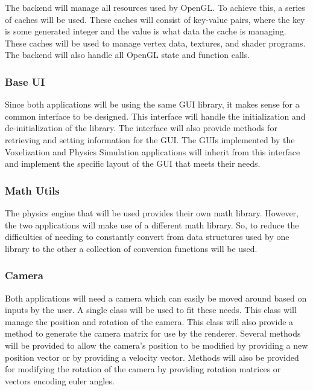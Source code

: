 The backend will manage all resources used by OpenGL. To achieve this, a series of caches will be 
used. These caches will consist of key-value pairs, where the key is some generated integer and the
value is what data the cache is managing. These caches will be used to manage vertex data, textures,
and shader programs. The backend will also handle all OpenGL state and function calls.

\subsubsection{Base UI}

Since both applications will be using the same GUI library, it makes sense for a common interface
to be designed. This interface will handle the initialization and de-initialization of the library.
The interface will also provide methods for retrieving and setting information for the GUI. The
GUIs implemented by the Voxelization and Physics Simulation applications will inherit from this
interface and implement the specific layout of the GUI that meets their needs.

\subsubsection{Math Utils}

The physics engine that will be used provides their own math library. However, the two applications
will make use of a different math library. So, to reduce the difficulties of needing to constantly
convert from data structures used by one library to the other a collection of conversion functions
will be used. 

\subsubsection{Camera}

Both applications will need a camera which can easily be moved around based on inputs by the user.
A single class will be used to fit these needs. This class will manage the position and rotation
of the camera. This class will also provide a method to generate the camera matrix for use by the
renderer. Several methods will be provided to allow the camera's position to be modified by 
providing a new position vector or by providing a velocity vector. Methods will also be provided for
modifying the rotation of the camera by providing rotation matrices or vectors encoding euler angles.

